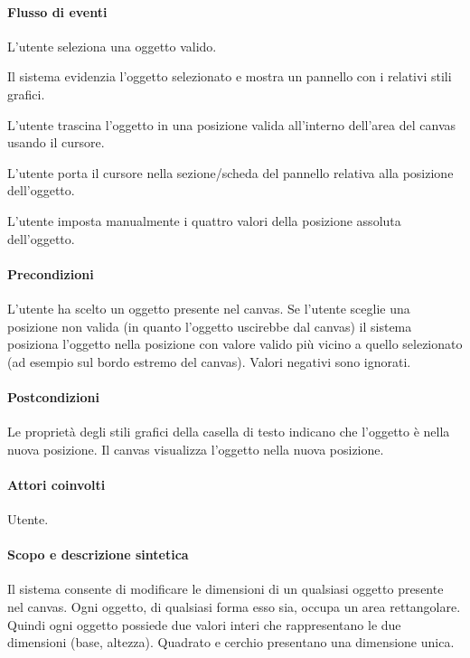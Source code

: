 \paragraph{Flusso di eventi}
\begin{elenconumerato}[\textbf{}]{\subsubsecindent}
\item L'utente seleziona una oggetto valido.
\item Il sistema evidenzia l'oggetto selezionato e mostra un pannello con i relativi stili grafici.
\item L'utente trascina l'oggetto in una posizione valida all'interno dell'area del canvas usando il cursore.
\item  L'utente porta  il cursore nella sezione/scheda del pannello relativa alla posizione dell'oggetto.
\item  L'utente imposta manualmente i quattro valori della posizione assoluta dell'oggetto.
\end{elenconumerato}
\paragraph{Precondizioni} L'utente ha scelto un oggetto presente nel canvas. Se l'utente sceglie una posizione non valida (in quanto l'oggetto uscirebbe dal canvas) il sistema posiziona l'oggetto nella posizione con valore valido pi\` u vicino a quello selezionato (ad esempio sul bordo estremo del canvas). Valori negativi sono ignorati.
\paragraph{Postcondizioni} Le propriet\` a degli stili grafici della casella di testo indicano che l'oggetto \` e nella nuova posizione. Il canvas visualizza l'oggetto nella nuova posizione.
 

\paragraph{Attori coinvolti} Utente.
\paragraph{Scopo e descrizione sintetica}   Il sistema consente di modificare le dimensioni di un qualsiasi oggetto presente nel canvas. Ogni oggetto, di qualsiasi forma esso sia, occupa un area rettangolare. Quindi ogni oggetto possiede due valori interi che rappresentano le due dimensioni (base, altezza). Quadrato e cerchio presentano una dimensione unica.
